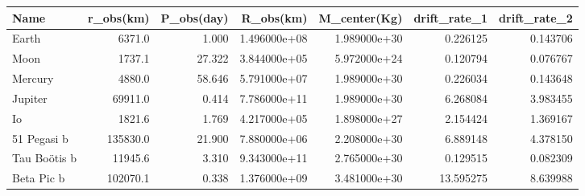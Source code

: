 \begin{tabular}{lrrrrrr}
\toprule
         Name &  r\_obs(km) &  P\_obs(day) &     R\_obs(km) &  M\_center(Kg) &  drift\_rate\_1 &  drift\_rate\_2 \\
\midrule
        Earth &     6371.0 &       1.000 &  1.496000e+08 &  1.989000e+30 &      0.226125 &      0.143706 \\
         Moon &     1737.1 &      27.322 &  3.844000e+05 &  5.972000e+24 &      0.120794 &      0.076767 \\
      Mercury &     4880.0 &      58.646 &  5.791000e+07 &  1.989000e+30 &      0.226034 &      0.143648 \\
      Jupiter &    69911.0 &       0.414 &  7.786000e+11 &  1.989000e+30 &      6.268084 &      3.983455 \\
           Io &     1821.6 &       1.769 &  4.217000e+05 &  1.898000e+27 &      2.154424 &      1.369167 \\
  51 Pegasi b &   135830.0 &      21.900 &  7.880000e+06 &  2.208000e+30 &      6.889148 &      4.378150 \\
 Tau Boötis b &    11945.6 &       3.310 &  9.343000e+11 &  2.765000e+30 &      0.129515 &      0.082309 \\
   Beta Pic b &   102070.1 &       0.338 &  1.376000e+09 &  3.481000e+30 &     13.595275 &      8.639988 \\
\bottomrule
\end{tabular}
